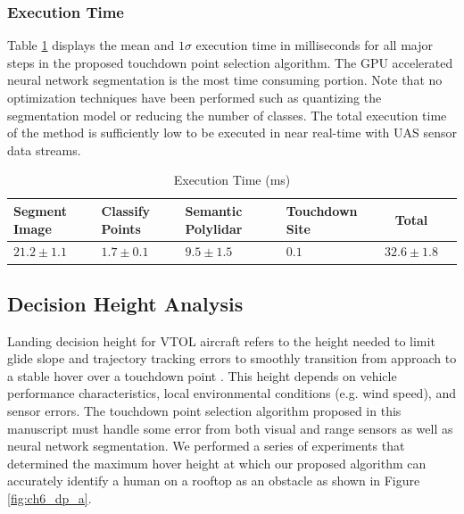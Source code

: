 \subsubsection{Execution Time}

Table \ref{table:execution Time} displays the mean and $1\sigma$ execution time in milliseconds for all major steps in the proposed touchdown point selection algorithm. The GPU accelerated neural network segmentation is the most time consuming portion. Note that no optimization techniques have been performed such as quantizing the segmentation model or reducing the number of classes. The total execution time of the method is sufficiently low to be executed in near real-time with UAS sensor data streams. 


\begin{table}[ht]
\centering
\caption{Execution Time (ms)} \label{table:execution Time}
\begin{tabular}{@{}p{1.9cm}p{1.9cm}p{1.9cm}p{1.9cm}cc@{}}
\toprule
Segment Image  & Classify Points & Semantic Polylidar  & Touchdown Site & Total\\ \midrule
$21.2 \pm 1.1$& $1.7 \pm 0.1$   & $9.5 \pm 1.5$   & $0.1$ & $32.6 \pm 1.8$      \\ \bottomrule
\end{tabular}

\end{table}


\subsection{Decision Height Analysis}

Landing decision height for VTOL aircraft refers to the height needed to limit glide slope and trajectory tracking errors to smoothly transition from approach to a stable hover over a touchdown point \cite{hoh_decision-height_1991}.  This height depends on vehicle performance characteristics, local environmental conditions (e.g. wind speed), and sensor errors. The touchdown point selection algorithm proposed in this manuscript must handle some error from both visual and range sensors as well as neural network segmentation.  We performed a series of experiments that determined the maximum hover height at which our proposed algorithm can accurately identify a human on a rooftop as an obstacle as shown in Figure \ref{fig:ch6_dp_a}.

